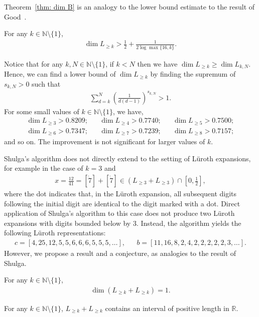 \documentclass{ws-ijnt}
\begin{document}
	Theorem~\ref{thm: dim B} is an analogy to the lower bound estimate to the result of Good~\cite[Theorem 2]{Good_1941}. 
	\begin{theorem}\label{thm: dim B}
		For any $k\in\mathbb{N}\setminus\{1\}$,
		\begin{align*}
			\dim{L_{\geq k}}>\frac{1}{2}+\frac{1}{2\log{\max{\{16,k\}}}}.
		\end{align*}
	\end{theorem}
	Notice that for any $k,N\in\mathbb{N}\setminus\{1\}$, if $k<N$ then we have $\dim{L_{\geq k}}\geq\dim{L_{k,N}}$. Hence, we can find a lower bound of $\dim{L_{\geq k}}$ by finding the supremum of $s_{k,N}>0$ such that
	\begin{align*}
		\sum_{d=k}^{N}\left(\frac{1}{d(d-1)}\right)^{s_{k,N}}>1.
	\end{align*}
	For some small values of $k\in\mathbb{N}\setminus\{1\}$, we have,
	\begin{align*}
		\dim{L_{\geq3}}>0.8209; && \dim{L_{\geq4}}>0.7740; && \dim{L_{\geq5}}>0.7500; \\
		\dim{L_{\geq6}}>0.7347; && \dim{L_{\geq7}}>0.7239; && \dim{L_{\geq8}}>0.7157;
	\end{align*}
	and so on. The improvement is not significant for larger values of $k$.
	
	Shulga’s algorithm does not directly extend to the setting of L\"uroth expansions, for example in the case of $k=3$ and 
	\begin{align*}
		x
		=\frac{12}{41}
		=[\dot7]+[\dot7]
		\in\left(L_{\geq3}+L_{\geq3}\right)\cap\left[0,\frac{1}{2}\right],
	\end{align*}
	where the dot indicates that, in the L\"uroth expansion, all subsequent digits following the initial digit are identical to the digit marked with a dot. Direct application of Shulga’s algorithm to this case does not produce two L\"uroth expansions with digits bounded below by 3. Instead, the algorithm yields the following L\"uroth representations:
	\begin{align*}
		c=[4,25,12,5,5,6,6,6,5,5,5,\ldots], &&
		b=[11,16,8,2,4,2,2,2,2,2,3,\ldots].
	\end{align*}
	However, we propose a result and a conjecture, as analogies to the result of Shulga.
	\begin{theorem}\label{thm: dim C}
		For any $k\in\mathbb{N}\setminus\{1\}$,
		\begin{align*}
			\dim{\left(L_{\geq k}+L_{\geq k}\right)=1}.
		\end{align*}
	\end{theorem}
	\begin{conjecture}
		For any $k\in\mathbb{N}\setminus\{1\}$, $L_{\geq k}+L_{\geq k}$ contains an interval of positive length in $\mathbb{R}$.
	\end{conjecture}
	
\end{document}
